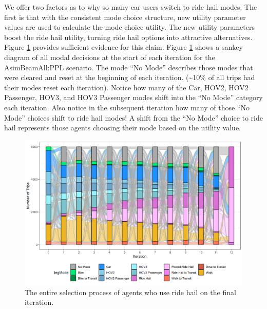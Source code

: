 \documentclass[fancy, masters]{byuthesis}
\begin{document}
We offer two factors as to why so many car users switch to ride hail modes. The first is that with the consistent mode choice structure, new utility parameter values are used to calculate the mode choice utility. The new utility parameters boost the ride hail utility, turning ride hail options into attractive alternatives. Figure \ref{fig:sankey} provides sufficient evidence for this claim. Figure \ref{fig:sankey} shows a sankey diagram of all modal decisions at the start of each iteration for the AsimBeamAll:PPL scenario. The mode ``No Mode'' describes those modes that were cleared and reset at the beginning of each iteration. (\textasciitilde10\% of all trips had their modes reset each iteration). Notice how many of the Car, HOV2, HOV2 Passenger, HOV3, and HOV3 Passenger modes shift into the ``No Mode'' category each iteration. Also notice in the subsequent iteration how many of those ``No Mode'' choices shift to ride hail modes! A shift from the ``No Mode'' choice to ride hail represents those agents choosing their mode based on the utility value.

\begin{landscape}

\begin{figure}[H]
\centering
\includegraphics{planshifts.png}
\caption{The entire selection process of agents who use ride hail on the final iteration.}
\label{fig:sankey}
\end{figure}

\end{landscape}
\end{document}
